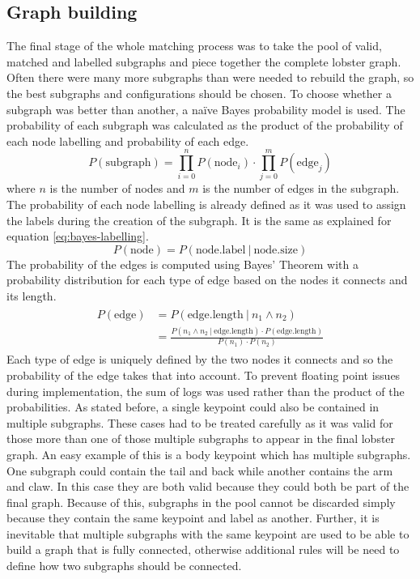 \subsection{Graph building}\label{sec:graph-creation}
The final stage of the whole matching process was to take the pool of valid, matched and labelled subgraphs and piece together the complete lobster graph. Often there were many more subgraphs than were needed to rebuild the graph, so the best subgraphs and configurations should be chosen. To choose whether a subgraph was better than another, a na\"{i}ve Bayes probability model is used. The probability of each subgraph was calculated as the product of the probability of each node labelling and probability of each edge. 
\begin{equation}
P(\text{subgraph}) = \prod_{i=0}^n P(\text{node}_{i}) \cdot \prod_{j=0}^m P(\text{edge}_{j})
\end{equation}
where $n$ is the number of nodes and $m$ is the number of edges in the subgraph. The probability of each node labelling is already defined as it was used to assign the labels during the creation of the subgraph. It is the same as explained for equation \ref{eq:bayes-labelling}.
\begin{equation}
P(\text{node}) = P(\text{node.label}\ |\ \text{node.size})
\end{equation}
The probability of the edges is computed using Bayes' Theorem with a probability distribution for each type of edge based on the nodes it connects and its length. 
\begin{align}
\begin{split}
P(\text{edge}) &= P(\text{edge.length}\ |\ n_{1} \wedge n_{2}) \\
 &= \frac{P(n_{1} \wedge n_{2}\ |\ \text{edge.length}) \cdot P(\text{edge.length})}{P(n_{1}) \cdot P(n_{2})}
\end{split}
\end{align}
Each type of edge is uniquely defined by the two nodes it connects and so the probability of the edge takes that into account. To prevent floating point issues during implementation, the sum of logs was used rather than the product of the probabilities. 
\n
As stated before, a single keypoint could also be contained in multiple subgraphs. These cases had to be treated carefully as it was valid for those more than one of those multiple subgraphs to appear in the final lobster graph. An easy example of this is a body keypoint which has multiple subgraphs. One subgraph could contain the tail and back while another contains the arm and claw. In this case they are both valid because they could both be part of the final graph. Because of this, subgraphs in the pool cannot be discarded simply because they contain the same keypoint and label as another. Further, it is inevitable that multiple subgraphs with the same keypoint are used to be able to build a graph that is fully connected, otherwise additional rules will be need to define how two subgraphs should be connected.
